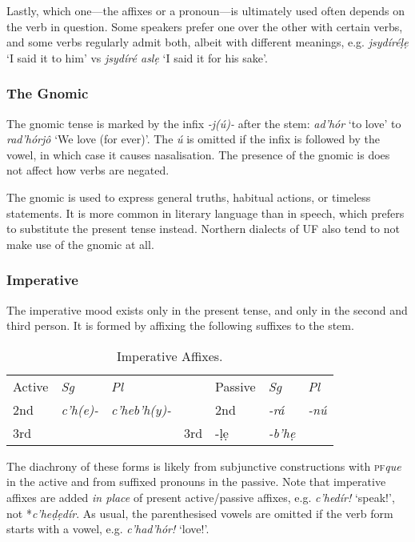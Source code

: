 \documentclass[a4paper, 12pt, twoside, final]{article}
\def\pfabbr{{\normalfont\scshape pf\space}}
\def\pf#1{\pfabbr\textit{#1}}
\let \nf \normalfont
\let \w \textit
\begin{document}
Lastly, which one—the  affixes or a  pronoun—is ultimately used often depends on the verb in question. Some speakers prefer
one over the other with certain verbs, and some verbs regularly admit both, albeit with different meanings, e.g. \w{jsydíréḷẹ}
‘I said it to him’ vs \w{jsydíré aslẹ} ‘I said it for his sake’.

\subsubsection{The Gnomic}\label{subsubsec:gnomic}
The gnomic tense is marked by the infix \w{-j(ú)-} after the stem: \w{ad’hór} ‘to love’ to \w{rad’hórjô} ‘We love (for ever)’.
The \w{ú} is omitted if the infix is followed by the vowel, in which case it causes nasalisation. The presence of the gnomic
is does not affect how verbs are negated.

The gnomic is used to express general truths, habitual actions, or timeless statements. It is more common in
literary language than in speech, which prefers to substitute the present tense instead. Northern dialects
of UF also tend to not make use of the gnomic at all.

\subsubsection{Imperative}
The imperative mood exists only in the present tense, and only in the second and third person. It is formed by
affixing the following suffixes to the stem.
\begin{table}[H]
\centering
\noindent\begin{tabular}{l|>{\it}l|>{\it}lll|>{\it}l|>{\it}l}
 Active&\nf Sg&\nf Pl& & Passive&\nf Sg&\nf Pl\\\cline{1-3}\cline{5-7}
2nd &c’h(e)-     &c’heb’h(y)- &&2nd& -rá   &-nú\\\cline{1-3}\cline{5-7}
3rd &\multicolumn{2}{c}{\it c’hel(ẹ)-} &&3rd& -ḷẹ   &-b’hẹ\\
\end{tabular}
\caption{Imperative Affixes.}\label{tab:imperative-affixes}
\end{table}

\noindent The diachrony of these forms is likely from subjunctive constructions with \pf{que} in the active
and from suffixed pronouns in the passive. Note that imperative affixes are added \textit{in place} of
present active/passive affixes, e.g. \w{c’hedír!} ‘speak!’, not *\w{c’heḍẹdír}. As usual, the parenthesised
vowels are omitted if the verb form starts with a vowel, e.g. \w{c’had’hór!} ‘love!’.
\end{document}

